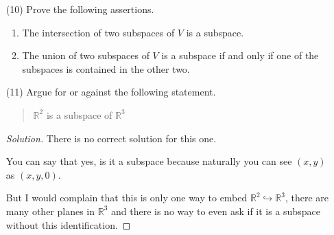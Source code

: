 \documentclass[a4paper,11pt]{article}
\theoremstyle{definition}
\newenvironment{solution}
  {\renewcommand\qedsymbol{$\blacksquare$}\begin{proof}[Solution]}
  {\end{proof}}
\begin{document}
\begin{enumerate}[(1)]
\begin{solution}
Indeed, suppose that $(f+g)(a) = 2$ for some non-zero $a$.
Then $f(a) +g(a) =2$.
This can only happen if $a$ is an integer which is a multiple of $\sqrt 2$:
\[
a = n\cdot \sqrt 2 \implies \sqrt 2 = \frac{a}{n}.
\]
But we know that $\sqrt 2$ can't be a fraction, so our initial assumption couldn't be right.

\begin{figure}
    \centering
    \texttt{[image: image.png]}
    \caption{Enter Caption}
    \label{fig:enter-label}
\end{figure}
\end{solution}

\item [(10)]
Prove the following assertions.
\begin{enumerate}
    \item
    The intersection of two subspaces of $V$ is a subspace.
    \item 
    The union of two subspaces of $V$ is a subspace if and only if one of the subspaces is contained in the other two.
\end{enumerate}
\item[(11)]
Argue for or against the following statement.
\begin{quote}
$\mathbb R^2$ is a subspace of $\mathbb R^3$
\end{quote}
\begin{solution}
There is no correct solution for this one.

You can say that yes, is it a subspace because naturally you can see $(x,y)$ as $(x,y,0)$.

But I would complain that this is only one way to embed $\mathbb R^2\hookrightarrow\mathbb R^3$, there are many other planes in $\mathbb R^3$ and there is no way to even ask if it is a subspace without this identification.
\end{solution}
\end{enumerate}
\end{document}
